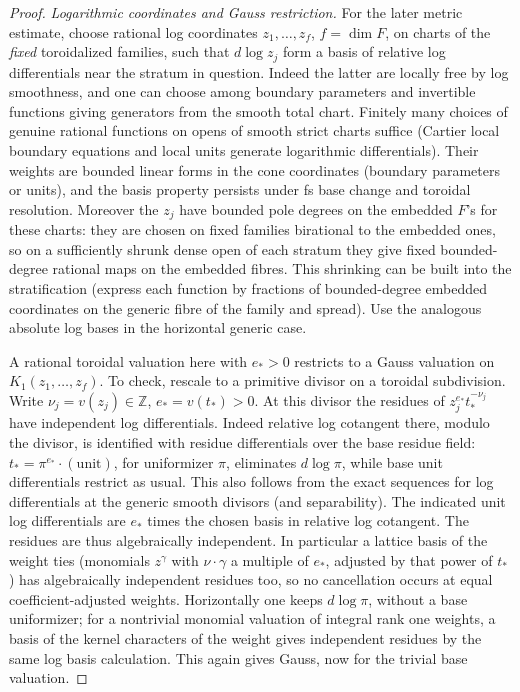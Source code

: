 \begin{proof}
\emph{Logarithmic coordinates and Gauss restriction.}
For the later metric estimate, choose rational log coordinates
\(z_1,\ldots,z_f\), \(f=\dim F\), on charts of the \emph{fixed}
toroidalized families, such that \(d\log z_j\) form a basis of relative
log differentials near the stratum in question.
Indeed the latter are locally free by log smoothness, and one can choose among boundary parameters and invertible functions giving generators from the smooth total chart.
Finitely many choices of genuine rational functions on opens of smooth strict charts suffice (Cartier local boundary equations and local units generate logarithmic differentials).
Their weights are bounded linear forms in the cone coordinates (boundary parameters or units), and the basis property persists under fs base change and toroidal resolution.
Moreover the \(z_j\) have bounded pole degrees on the embedded \(F\)'s for these charts: they are chosen on fixed families birational to the embedded ones, so on a sufficiently shrunk dense open of each stratum they give fixed bounded-degree rational maps on the embedded fibres.
This shrinking can be built into the stratification (express each function by fractions of bounded-degree embedded coordinates on the generic fibre of the family and spread).
Use the analogous absolute log bases in the horizontal generic case.

A rational toroidal valuation here with \(e_*>0\) restricts to a Gauss valuation on \(K_1(z_1,\ldots,z_f)\).
To check, rescale to a primitive divisor on a toroidal subdivision.
Write \(\nu_j=v(z_j)\in\mathbb Z\), \(e_*=v(t_*)>0\).
At this divisor the residues of \(z_j^{e_*}t_*^{-\nu_j}\) have independent log differentials.
Indeed relative log cotangent there, modulo the divisor, is identified with residue differentials over the base residue field: \(t_*=\pi^{e_*}\cdot(\text{unit})\), for uniformizer \(\pi\), eliminates \(d\log\pi\), while base unit differentials restrict as usual.
This also follows from the exact sequences for log differentials at the generic smooth divisors (and separability).
The indicated unit log differentials are \(e_*\) times the chosen basis in relative log cotangent.
The residues are thus algebraically independent.
In particular a lattice basis of the weight ties (monomials \(z^\gamma\) with \(\nu\cdot\gamma\) a multiple of \(e_*\), adjusted by that power of \(t_*\)) has algebraically independent residues too, so no cancellation occurs at equal coefficient-adjusted weights.
Horizontally one keeps \(d\log\pi\), without a base uniformizer; for a nontrivial monomial valuation of integral rank one weights, a basis of the kernel characters of the weight gives independent residues by the same log basis calculation.
This again gives Gauss, now for the trivial base valuation.

\end{proof}

